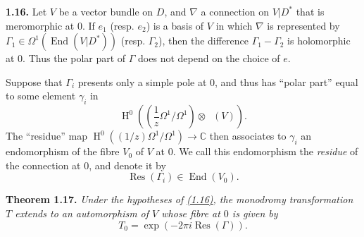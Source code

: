 \documentclass{report}
\newenvironment{itenv}[1]
  {\phantomsection\par\medskip\noindent\textbf{#1.}\itshape}
  {\par\medskip}
\newenvironment{rmenv}[1]
  {\phantomsection\par\medskip\noindent\textbf{#1.}\rmfamily}
  {\par\medskip}
\newcommand{\CC}{\mathbb{C}}
\DeclareMathOperator{\End}{End}
\DeclareMathOperator{\shEnd}{\underline{End}}
\DeclareMathOperator{\HH}{H}
\DeclareMathOperator{\Res}{Res}
\begin{document}
\begin{rmenv}{1.16}
\label{II.1.16}
  Let $V$ be a vector bundle on $D$, and $\nabla$ a connection on $V|D^*$ that is meromorphic at $0$.
  If $e_1$ (resp. $e_2$) is a basis of $V$ in which $\nabla$ is represented by $\Gamma_1\in\Omega^1(\End(V|D^*))$ (resp. $\Gamma_2$), then the difference $\Gamma_1-\Gamma_2$ is holomorphic at $0$.
  Thus the polar part of $\Gamma$ does not depend on the choice of $e$.

  Suppose that $\Gamma_i$ presents only a simple pole at $0$, and thus has ``polar part'' equal to some element $\gamma_i$ in
  \[
    \HH^0\left( \left(\frac1z\Omega^1/\Omega^1\right)\otimes\shEnd(V) \right).
  \]
  The ``residue'' map $\HH^0((1/z)\Omega^1/\Omega^1)\to\CC$ then associates to $\gamma_i$ an endomorphism of the fibre $V_0$ of $V$ at $0$.
  We call this endomorphism the \emph{residue} of the connection at $0$, and denote it by
  \[
    \Res(\Gamma_i)\in\End(V_0).
  \]
\end{rmenv}

\begin{itenv}{Theorem 1.17}
\label{II.1.17}
  Under the hypotheses of \hyperref[II.1.16]{(1.16)}, the monodromy transformation $T$ extends to an automorphism of $V$ whose fibre at $0$ is given by
  \[
    T_0 = \exp(-2\pi i\Res(\Gamma)).
  \]
\end{itenv}
\end{document}
